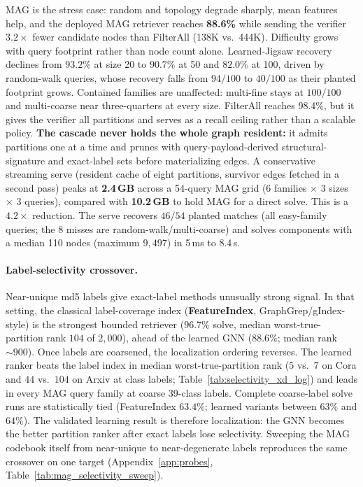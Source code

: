\documentclass{article}
\begin{document}
MAG is the stress case: random and topology degrade sharply, mean features help, and the deployed MAG retriever reaches \textbf{88.6\%} while sending the verifier $3.2\times$ fewer candidate nodes than FilterAll (138K vs.\ 444K). Difficulty grows with query footprint rather than node count alone. Learned-Jigsaw recovery declines from $93.2\%$ at size 20 to $90.7\%$ at 50 and $82.0\%$ at 100, driven by random-walk queries, whose recovery falls from $94/100$ to $40/100$ as their planted footprint grows. Contained families are unaffected: multi-fine stays at $100/100$ and multi-coarse near three-quarters at every size. FilterAll reaches 98.4\%, but it gives the verifier all partitions and serves as a recall ceiling rather than a scalable policy. \textbf{The cascade never holds the whole graph resident:} it admits partitions one at a time and prunes with query-payload-derived structural-signature and exact-label sets before materializing edges. A conservative streaming serve (resident cache of eight partitions, survivor edges fetched in a second pass) peaks at \textbf{2.4\,GB} across a 54-query MAG grid (6 families $\times$ 3 sizes $\times$ 3 queries), compared with \textbf{10.2\,GB} to hold MAG for a direct solve. This is a $4.2\times$ reduction. The serve recovers $46/54$ planted matches (all easy-family queries; the 8 misses are random-walk/multi-coarse) and solves components with a median 110 nodes (maximum $9{,}497$) in 5\,ms to 8.4\,s.

\paragraph{Label-selectivity crossover.} Near-unique md5 labels give exact-label methods unusually strong signal. In that setting, the classical label-coverage index (\textbf{FeatureIndex}, GraphGrep/gIndex-style) is the strongest bounded retriever ($96.7\%$ solve, median worst-true-partition rank $104$ of $2{,}000$), ahead of the learned GNN ($88.6\%$; median rank ${\sim}900$). Once labels are coarsened, the localization ordering reverses. The learned ranker beats the label index in median worst-true-partition rank ($5$ vs.\ $7$ on Cora and $44$ vs.\ $104$ on Arxiv at class labels; Table~\ref{tab:selectivity_xd_log}) and leads in every MAG query family at coarse 39-class labels. Complete coarse-label solve runs are statistically tied (FeatureIndex $63.4\%$; learned variants between $63\%$ and $64\%$). The validated learning result is therefore localization: the GNN becomes the better partition ranker after exact labels lose selectivity. Sweeping the MAG codebook itself from near-unique to near-degenerate labels reproduces the same crossover on one target (Appendix~\ref{app:probes}, Table~\ref{tab:mag_selectivity_sweep}).
\end{document}
